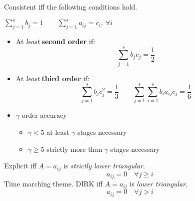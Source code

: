             Consistent iff the following conditions hold.
            \begin{center}
                $\displaystyle{\sum_{j=1}^s b_j=1 \qquad \sum_{j=1}^s a_{ij}=c_i, \ \forall i}$
            \end{center}
            \begin{itemize}
                \item At \textit{least} \textbf{second order} if:
                    $$
                        \sum_{j=1}^s b_j c_j =\frac{1}{2}
                    $$
                \item At \textit{least} \textbf{third order} if:
                    $$
                    \sum_{j=1}^s b_jc_j^2=\frac{1}{3} \qquad \sum_{j=1}^s\sum\limits_{i=1}^s b_ia_{ij}c_j=\frac{1}{6}
                    $$
                \item $\gamma$-order accuracy
                    \begin{itemize}[label=$\rightarrow$]
                        \item $\gamma <5$ at least $\gamma$ stages necessary 
                        \item $\gamma \geq 5$ strictly more than $\gamma$ stages necessary
                    \end{itemize}
            \end{itemize}
            Explicit iff $A=a_{ij}$ is \textit{strictly lower triangular}.
            $$a_{ij} = 0 \quad \forall j\geq i$$
            Time marching theme.
            DIRK iff $A=a_{ij}$ is \textit{lower triangular}.
            $$a_{ij} = 0 \quad \forall j > i$$
            \vspace{-1em}